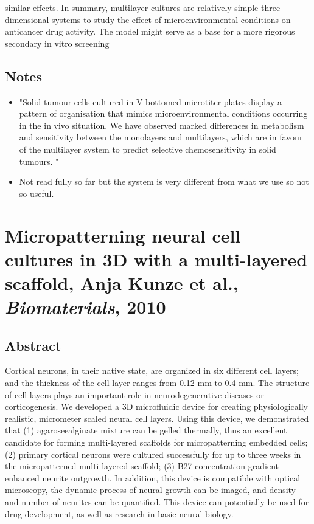 \documentclass[11pt,a4paper]{article}
\begin{document}
similar effects. In summary, multilayer cultures are relatively simple three-dimensional systems to study the effect of microenvironmental conditions on anticancer drug activity. The model might serve as a base for a more rigorous secondary in vitro screening

\subsection*{Notes}
\begin{itemize}
\item "Solid tumour cells cultured in V-bottomed microtiter plates display a pattern of organisation that mimics
microenvironmental conditions occurring in the in vivo situation. We have observed marked differences in metabolism and sensitivity between the monolayers and multilayers, which are in favour of the multilayer system to predict selective chemosensitivity in solid tumours. "
\item Not read fully so far but the system is very different from what we use so not so useful.
\end{itemize}

\section*{Micropatterning neural cell cultures in 3D with a multi-layered scaffold, Anja Kunze et al., \textit{Biomaterials}, 2010}
\subsection*{Abstract}
Cortical neurons, in their native state, are organized in six different cell layers; and the thickness of the
cell layer ranges from 0.12 mm to 0.4 mm. The structure of cell layers plays an important role in neurodegenerative diseases or corticogenesis. We developed a 3D microfluidic device for creating physiologically realistic, micrometer scaled neural cell layers. Using this device, we demonstrated that (1) agaroseealginate mixture can be gelled thermally, thus an excellent candidate for forming multi-layered scaffolds for micropatterning embedded cells; (2) primary cortical neurons were cultured successfully for up to three weeks in the micropatterned multi-layered scaffold; (3) B27 concentration gradient enhanced neurite outgrowth. In addition, this device is compatible with optical microscopy, the dynamic process of neural growth can be imaged, and density and number of neurites can be quantified. This device can potentially be used for drug development, as well as research in basic neural biology.
\end{document}
